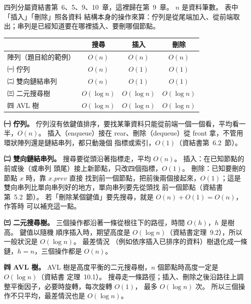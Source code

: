 \begin{pastsoln}
四列分屬資結書第~6、5、9、10~章，這裡歸在第~9~章。 $n$ 是資料筆數。 表中「插入」「刪除」照各資料
結構本身的操作來算：佇列是從尾端加入、從前端取出；串列是已經知道要在哪裡插入、要刪哪個節點。
\begin{center}
\begin{tabular}{lccc}
\toprule
 & 搜尋 & 插入 & 刪除 \\
\midrule
陣列（題目給的範例） & $O(n)$ & $O(n)$ & $O(n)$ \\
㈠ 佇列 & $O(n)$ & $O(1)$ & $O(1)$ \\
㈡ 雙向鏈結串列 & $O(n)$ & $O(1)$ & $O(1)$ \\
㈢ 二元搜尋樹 & $O(\log n)$ & $O(\log n)$ & $O(\log n)$ \\
㈣ AVL 樹 & $O(\log n)$ & $O(\log n)$ & $O(\log n)$ \\
\bottomrule
\end{tabular}
\end{center}

\textbf{㈠ 佇列。} 佇列沒有依鍵值排序，要找某筆資料只能從前端一個一個看，平均看一半，$O(n)$。
插入（enqueue）接在 rear、刪除（dequeue）從 front 拿，不管用環狀陣列還是鏈結串列，都只動幾個
指標或索引，$O(1)$（資結書第~6.2~節）。

\textbf{㈡ 雙向鏈結串列。} 搜尋要從頭沿著指標走，平均 $O(n)$。 插入：在已知節點的前或後（或串列
頭尾）接上新節點，只改四個指標，$O(1)$。 刪除：已知要刪的節點 $x$ 時，靠 $x.\mathit{prev}$ 直接
找到前一個節點，把前後兩個接起來，$O(1)$；這是雙向串列比單向串列好的地方，單向串列要先從頭找
前一個節點（資結書第~5.2~節）。 若「刪除某個鍵值」要先搜尋，就是 $O(n) + O(1) = O(n)$，作答時
可以補充這一點。

\textbf{㈢ 二元搜尋樹。} 三個操作都沿著一條從根往下的路徑，時間 $O(h)$，$h$ 是樹高。 鍵值以隨機
順序插入時，期望高度是 $O(\log n)$（資結書定理~9.2），所以一般狀況是 $O(\log n)$。 最差情況
（例如依序插入已排序的資料）樹退化成一條鏈，$h = n$，三個操作都是 $O(n)$。

\textbf{㈣ AVL 樹。} AVL 樹是高度平衡的二元搜尋樹，$n$ 個節點時高度一定是 $O(\log n)$（資結書
定理~10.1）。 搜尋走一條路徑；插入、刪除之後沿路往上調整平衡因子，必要時旋轉，每次旋轉 $O(1)$，
最多 $O(\log n)$ 次。 所以三個操作不只平均，最差情況也是 $O(\log n)$。
\end{pastsoln}
